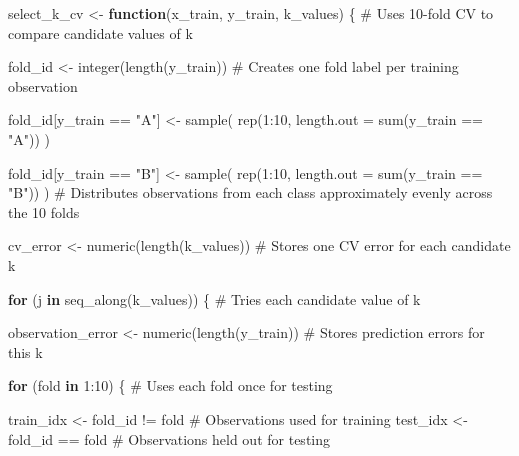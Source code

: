 \documentclass[
  letterpaper,
  DIV=11,
  numbers=noendperiod]{scrreprt}
\newenvironment{Shaded}{\begin{snugshade}}{\end{snugshade}}
\newcommand{\AttributeTok}[1]{\textcolor[rgb]{0.40,0.45,0.13}{#1}}
\newcommand{\CommentTok}[1]{\textcolor[rgb]{0.37,0.37,0.37}{#1}}
\newcommand{\ControlFlowTok}[1]{\textcolor[rgb]{0.00,0.23,0.31}{\textbf{#1}}}
\newcommand{\DecValTok}[1]{\textcolor[rgb]{0.68,0.00,0.00}{#1}}
\newcommand{\FunctionTok}[1]{\textcolor[rgb]{0.28,0.35,0.67}{#1}}
\newcommand{\NormalTok}[1]{\textcolor[rgb]{0.00,0.23,0.31}{#1}}
\newcommand{\OtherTok}[1]{\textcolor[rgb]{0.00,0.23,0.31}{#1}}
\newcommand{\SpecialCharTok}[1]{\textcolor[rgb]{0.37,0.37,0.37}{#1}}
\newcommand{\StringTok}[1]{\textcolor[rgb]{0.13,0.47,0.30}{#1}}
\begin{document}
\begin{Shaded}
\begin{Highlighting}[]
\NormalTok{select\_k\_cv }\OtherTok{\textless{}{-}} \ControlFlowTok{function}\NormalTok{(x\_train, y\_train, k\_values) \{ }\CommentTok{\# Uses 10{-}fold CV to compare candidate values of k}
  
\NormalTok{  fold\_id }\OtherTok{\textless{}{-}} \FunctionTok{integer}\NormalTok{(}\FunctionTok{length}\NormalTok{(y\_train)) }\CommentTok{\# Creates one fold label per training observation}
  
\NormalTok{  fold\_id[y\_train }\SpecialCharTok{==} \StringTok{"A"}\NormalTok{] }\OtherTok{\textless{}{-}} \FunctionTok{sample}\NormalTok{(}
    \FunctionTok{rep}\NormalTok{(}\DecValTok{1}\SpecialCharTok{:}\DecValTok{10}\NormalTok{, }\AttributeTok{length.out =} \FunctionTok{sum}\NormalTok{(y\_train }\SpecialCharTok{==} \StringTok{"A"}\NormalTok{))}
\NormalTok{  )}
  
\NormalTok{  fold\_id[y\_train }\SpecialCharTok{==} \StringTok{"B"}\NormalTok{] }\OtherTok{\textless{}{-}} \FunctionTok{sample}\NormalTok{(}
    \FunctionTok{rep}\NormalTok{(}\DecValTok{1}\SpecialCharTok{:}\DecValTok{10}\NormalTok{, }\AttributeTok{length.out =} \FunctionTok{sum}\NormalTok{(y\_train }\SpecialCharTok{==} \StringTok{"B"}\NormalTok{))}
\NormalTok{  )}
  \CommentTok{\# Distributes observations from each class approximately evenly across the 10 folds}
  
\NormalTok{  cv\_error }\OtherTok{\textless{}{-}} \FunctionTok{numeric}\NormalTok{(}\FunctionTok{length}\NormalTok{(k\_values)) }\CommentTok{\# Stores one CV error for each candidate k}
  
  \ControlFlowTok{for}\NormalTok{ (j }\ControlFlowTok{in} \FunctionTok{seq\_along}\NormalTok{(k\_values)) \{ }\CommentTok{\# Tries each candidate value of k}
    
\NormalTok{    observation\_error }\OtherTok{\textless{}{-}} \FunctionTok{numeric}\NormalTok{(}\FunctionTok{length}\NormalTok{(y\_train)) }\CommentTok{\# Stores prediction errors for this k}
    
    \ControlFlowTok{for}\NormalTok{ (fold }\ControlFlowTok{in} \DecValTok{1}\SpecialCharTok{:}\DecValTok{10}\NormalTok{) \{ }\CommentTok{\# Uses each fold once for testing}
      
\NormalTok{      train\_idx }\OtherTok{\textless{}{-}}\NormalTok{ fold\_id }\SpecialCharTok{!=}\NormalTok{ fold }\CommentTok{\# Observations used for training}
\NormalTok{      test\_idx }\OtherTok{\textless{}{-}}\NormalTok{ fold\_id }\SpecialCharTok{==}\NormalTok{ fold }\CommentTok{\# Observations held out for testing}
      

\end{Highlighting}
\end{Shaded}
\end{document}
